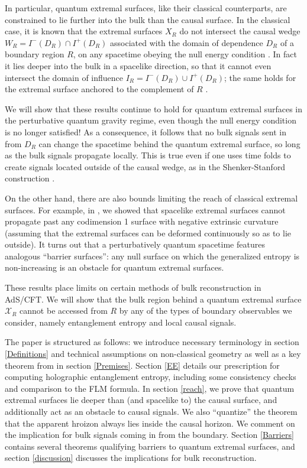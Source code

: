 \documentclass[12pt]{article}
\theoremstyle{remark}
\numberwithin{equation}{section}
\numberwithin{equation}{section}
\begin{document}
In particular, quantum extremal surfaces, like their classical counterparts, are constrained to lie further into the bulk than the causal surface.  In the classical case, it is known that the extremal surfaces $X_R$ do not intersect the causal wedge $W_R = I^-(D_R) \cap I^+(D_R)$ associated with the domain of dependence $D_R$ of a boundary region $R$, on any spacetime obeying the null energy condition \cite{WallMaximin, HubenyRangamani}.  In fact it lies deeper into the bulk in a spacelike direction, so that it cannot even intersect the domain of influence $I_R = I^-(D_R) \cup I^+(D_R)$; the same holds for the extremal surface anchored to the complement of $R$ \cite{WallMaximin}.

We will show that these results continue to hold for quantum extremal surfaces in the perturbative quantum gravity regime, even though the null energy condition is no longer satisfied!  As a consequence, it follows that no bulk signals sent in from $D_R$ can change the spacetime behind the quantum extremal surface, so long as the bulk signals propagate locally.  This is true even if one uses time folds to create signals located outside of the causal wedge, as in the Shenker-Stanford construction \cite{ShenkerStanford}.

On the other hand, there are also bounds limiting the reach of classical extremal surfaces. For example, in \cite{EngelhardtWall}, we showed that spacelike extremal surfaces cannot propagate past any codimension 1 surface with negative extrinsic curvature (assuming that the extremal surfaces can be deformed continuously so as to lie outside). It turns out that a perturbatively quantum spacetime features analogous ``barrier surfaces'': any null surface on which the generalized entropy is non-increasing is an obstacle for quantum extremal surfaces.

These results place limits on certain methods of bulk reconstruction in AdS/CFT.  We will show that the bulk region behind a quantum extremal surface $\mathcal{X}_R$ cannot be accessed from $R$ by any of the types of boundary observables we consider, namely entanglement entropy and local causal signals.

The paper is structured as follows: we introduce necessary terminology in section \ref{Definitions} and technical assumptions on non-classical geometry as well as a key theorem from \cite{Wall12} in section \ref{Premises}. Section \ref{EE} details our prescription for computing holographic entanglement entropy, including some consistency checks and comparison to the FLM formula. In section \ref{reach}, we prove that quantum extremal surfaces lie deeper than (and spacelike to) the causal surface, and additionally act as an obstacle to causal signals.  We also ``quantize'' the theorem that the apparent hroizon always lies inside the causal horizon.  We comment on the implication for bulk signals coming in from the boundary.  Section \ref{Barriers} contains several theorems qualifying barriers to quantum extremal surfaces, and section \ref{discussion} discusses the implications for bulk reconstruction.
\end{document}
